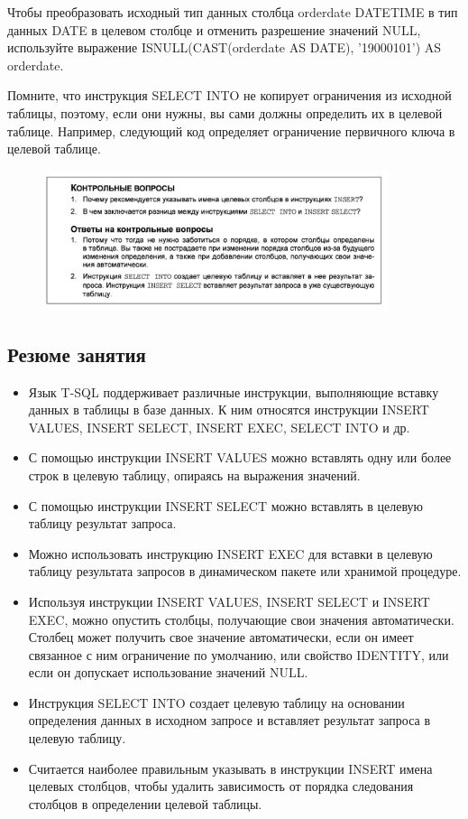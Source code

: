 Чтобы преобразовать исходный тип данных столбца
orderdate DATETIME в тип данных DATE в целевом столбце и отменить разрешение
значений NULL, используйте выражение ISNULL(CAST(orderdate AS DATE),
'19000101') AS orderdate. 

Помните, что инструкция SELECT INTO не копирует ограничения из исходной таблицы, поэтому, если они нужны, вы сами должны определить их в целевой таблице.
Например, следующий код определяет ограничение первичного ключа в целевой
таблице. 

\begin{figure}[h!]
	\begin{center}
		\includegraphics[width=0.9\textwidth]{img/control21.png}
	\end{center}
	\captionsetup{justification=centering}
\end{figure}


		
\subsection*{Резюме занятия}
\begin{itemize}
	\item Язык T-SQL поддерживает различные инструкции, выполняющие вставку данных в таблицы в базе данных. К ним относятся инструкции INSERT VALUES, INSERT
	SELECT, INSERT EXEC, SELECT INTO и др. 
	\item С помощью инструкции INSERT VALUES можно вставлять одну или более строк
	в целевую таблицу, опираясь на выражения значений. 
	\item С помощью инструкции INSERT SELECT можно вставлять в целевую таблицу результат запроса. 
	\item Можно использовать инструкцию INSERT EXEC для вставки в целевую таблицу
	результата запросов в динамическом пакете или хранимой процедуре.
	\item  Используя инструкции INSERT VALUES, INSERT SELECT и INSERT EXEC, можно опустить столбцы, получающие свои значения автоматически. Столбец может получить свое значение автоматически, если он имеет связанное с ним ограничение
	по умолчанию, или свойство IDENTITY, или если он допускает использование
	значений NULL.
	\item Инструкция SELECT INTO создает целевую таблицу на основании определения
	данных в исходном запросе и вставляет результат запроса в целевую таблицу. 
	\item Считается наиболее правильным указывать в инструкции INSERT имена целевых
	столбцов, чтобы удалить зависимость от порядка следования столбцов в определении целевой таблицы. 
\end{itemize}

